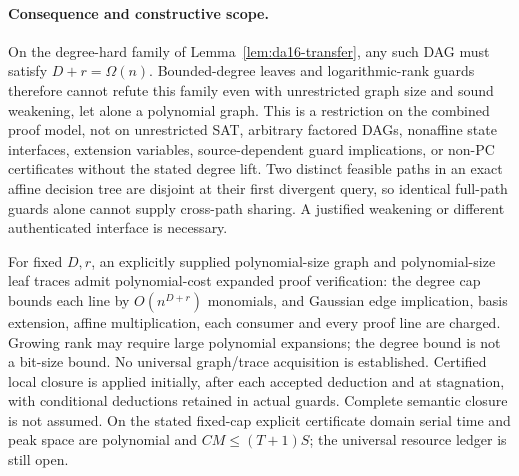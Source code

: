 \documentclass[11pt]{article}
\begin{document}
\paragraph{Consequence and constructive scope.}
On the degree-hard family of Lemma~\ref{lem:da16-transfer}, any such DAG must satisfy $D+r=\Omega(n)$. Bounded-degree leaves and logarithmic-rank guards therefore cannot refute this family even with unrestricted graph size and sound weakening, let alone a polynomial graph. This is a restriction on the combined proof model, not on unrestricted SAT, arbitrary factored DAGs, nonaffine state interfaces, extension variables, source-dependent guard implications, or non-PC certificates without the stated degree lift. Two distinct feasible paths in an exact affine decision tree are disjoint at their first divergent query, so identical full-path guards alone cannot supply cross-path sharing. A justified weakening or different authenticated interface is necessary.

For fixed $D,r$, an explicitly supplied polynomial-size graph and polynomial-size leaf traces admit polynomial-cost expanded proof verification: the degree cap bounds each line by $O(n^{D+r})$ monomials, and Gaussian edge implication, basis extension, affine multiplication, each consumer and every proof line are charged. Growing rank may require large polynomial expansions; the degree bound is not a bit-size bound. No universal graph/trace acquisition is established. Certified local closure is applied initially, after each accepted deduction and at stagnation, with conditional deductions retained in actual guards. Complete semantic closure is not assumed. On the stated fixed-cap explicit certificate domain serial time and peak space are polynomial and $CM\le(T+1)S$; the universal resource ledger is still open.
\end{document}
